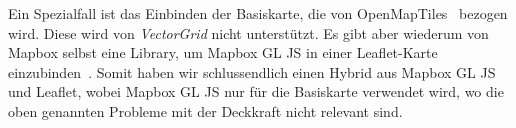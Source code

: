 Ein Spezialfall ist das Einbinden der Basiskarte, die von OpenMapTiles~\cite{openmaptiles} bezogen wird.
Diese wird von \emph{VectorGrid} nicht unterstützt.
Es gibt aber wiederum von Mapbox selbst eine Library, um Mapbox GL JS in einer Leaflet-Karte einzubinden~\cite{mapbox_gl_leaflet}.
Somit haben wir schlussendlich einen Hybrid aus Mapbox GL JS und Leaflet, wobei Mapbox GL JS nur für die Basiskarte verwendet wird, wo die oben genannten Probleme mit der Deckkraft nicht relevant sind.
